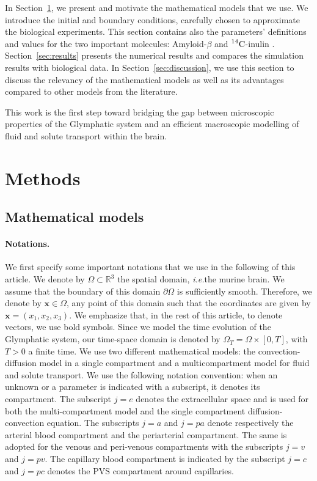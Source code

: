 \documentclass[10pt,letterpaper]{article}
\newcommand{\ie}{\emph{i.e.}\;}
\newcommand{\1}{^{(1)}}
\newcommand{\2}{^{(2)}}
\newcommand{\R}{\mathbb{R}}
\newcommand {\p}   {\partial}
\newcommand {\x}   {\mathbf{x}}
\newcommand{\Cinulin}{$\prescript{14}{}{\text{C}}$-inulin }
\begin{document}
In Section~\ref{sec:method}, we present and motivate the mathematical models that we use. We introduce the initial and boundary conditions, carefully chosen to approximate the biological experiments. This section contains also the parameters' definitions and values for the two important molecules: Amyloid-$\beta$ and \Cinulin.
Section~\ref{sec:results} presents the numerical results and compares the simulation results with biological data. 
In Section~\ref{sec:discussion}, we use this section to discuss the relevancy of the mathematical models as well as its advantages compared to other models from the literature.      

This work is the first step toward bridging the gap between microscopic properties of the Glymphatic system and an efficient macroscopic modelling of fluid and solute transport within the brain. 


\section{Methods}
\label{sec:method}
\subsection{Mathematical models}
\paragraph{Notations.} We first specify some important notations that we use in the following of this article. We denote by $\Omega \subset \R^3$ the spatial domain, \ie the murine brain. We assume that the boundary of this domain $\p \Omega$ is sufficiently smooth. Therefore, we denote by $\x \in \Omega$, any point of this domain such that the coordinates are given by $\x =(x_1,x_2,x_3)$. We emphasize that, in the rest of this article, to denote vectors, we use bold symbols. Since we model the time evolution of the Glymphatic system, our time-space domain is denoted by $\Omega_T = \Omega \times [0,T]$, with $T> 0$ a finite time. We use two different mathematical models: the convection-diffusion model in a single compartment and a multicompartment model for fluid and solute transport. We use the following notation convention: when an unknown or a parameter is indicated with a subscript, it denotes its compartment. The subscript $j=e$ denotes the extracellular space and is used for both the multi-compartment model and the single compartment diffusion-convection equation. The subscripts $j=a$ and $j=pa$ denote respectively the arterial blood compartment and the periarterial compartment. The same is adopted for the venous and peri-venous compartments with the subscripts $j=v$ and $j=pv$. The capillary blood compartment is indicated by the subscript $j=c$ and $j=pc$ denotes the PVS compartment around capillaries.
\end{document}
